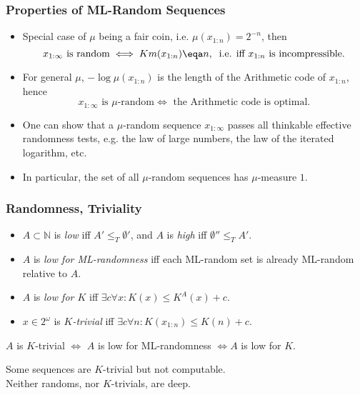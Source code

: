 \documentclass[UTF8,11pt,colorlinks,compress,openany]{beamer}%
\begin{document}
\begin{frame}\frametitle{Properties of ML-Random Sequences}
\begin{itemize}
\item Special case of $\mu$ being a fair coin, i.e. $\mu(x_{1:n}) = 2^{-n}$, then
\[\mbox{$x_{1:\infty}$ is random} \iff Km(x_{1:n})\eqa n,\;\; \mbox{i.e. iff $x_{1:n}$ is incompressible.}\]
\item For general $\mu$, $-\log\mu(x_{1:n})$ is the length of the Arithmetic code of $x_{1:n}$, hence
\[\mbox{$x_{1:\infty}$ is $\mu$-random} \iff \mbox{ the Arithmetic code is optimal.}\]
\item One can show that a $\mu$-random sequence $x_{1:\infty}$ passes all thinkable effective randomness tests, e.g. the law of large numbers, the law of the iterated logarithm, etc.
\item In particular, the set of all $\mu$-random sequences has $\mu$-measure $1$.
\end{itemize}
\end{frame}

\begin{frame}\frametitle{Randomness, Triviality}
\begin{itemize}
\item $A\subset\mathbb{N}$ is \emph{low} iff $A'\leq_T\emptyset'$, and $A$ is \emph{high} iff $\emptyset''\leq_T A'$.
\item $A$ is \emph{low for ML-randomness} iff each ML-random set is already ML-random relative to $A$.
\item $A$ is \emph{low for $K$} iff $\exists c\forall x: K(x)\leq K^A(x)+c$.
\item $x\in 2^\omega$ is \emph{$K$-trivial} iff $\exists c\forall n: K(x_{1:n})\leq K(n)+c$.
\end{itemize}
\begin{theorem}
$A$ is $K$-trivial $\iff$ $A$ is low for ML-randomness $\iff A$ is low for $K$.
\end{theorem}
Some sequences are $K$-trivial but not computable.\\
Neither randoms, nor $K$-trivials, are deep.
\end{frame}
\end{document}
